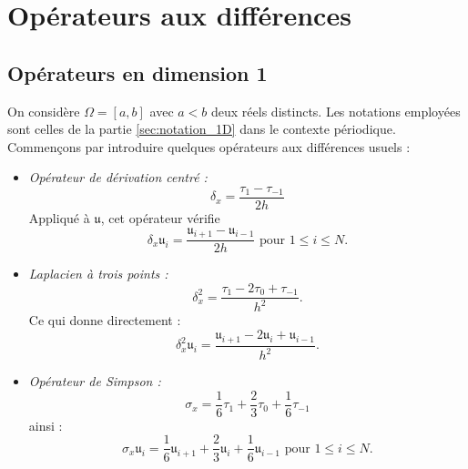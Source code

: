 \section{Opérateurs aux différences}

\subsection{Opérateurs en dimension 1}

On considère $\Omega = [a,b]$ avec $a<b$ deux réels distincts. Les notations employées sont celles de la partie \ref{sec:notation_1D} dans le contexte périodique.
Commençons par introduire quelques opérateurs aux différences usuels :
\begin{itemize}
\item \textit{Opérateur de dérivation centré :}
\begin{equation}
\delta_x = \dfrac{\tau_1 - \tau_{-1}}{2h}
\end{equation}
Appliqué à $\mathfrak{u}$, cet opérateur vérifie 
\begin{equation}
\delta_x \mathfrak{u}_i = \dfrac{\mathfrak{u}_{i+1} - \mathfrak{u}_{i-1}}{2h} \text{ pour } 1 \leq i \leq N.
\end{equation}

\item \textit{Laplacien à trois points :}
\begin{equation}
\delta_x^2 = \dfrac{\tau_1 - 2 \tau_{0} + \tau_{-1}}{h^2}.
\end{equation}
Ce qui donne directement :
\begin{equation}
\delta_x^2 \mathfrak{u}_i = \dfrac{\mathfrak{u}_{i+1} - 2 \mathfrak{u}_i + \mathfrak{u}_{i-1}}{h^2}.
\end{equation}

\item \textit{Opérateur de Simpson :}
\begin{equation}
\sigma_x = \dfrac{1}{6} \tau_1 + \dfrac{2}{3} \tau_0 + \dfrac{1}{6} \tau_{-1}
\end{equation}
ainsi :
\begin{equation}
\sigma_x \mathfrak{u}_i = \dfrac{1}{6} \mathfrak{u}_{i+1} + \dfrac{2}{3} \mathfrak{u}_i + \dfrac{1}{6} \mathfrak{u}_{i-1} \text{ pour } 1 \leq i \leq N.
\end{equation}
\end{itemize}

